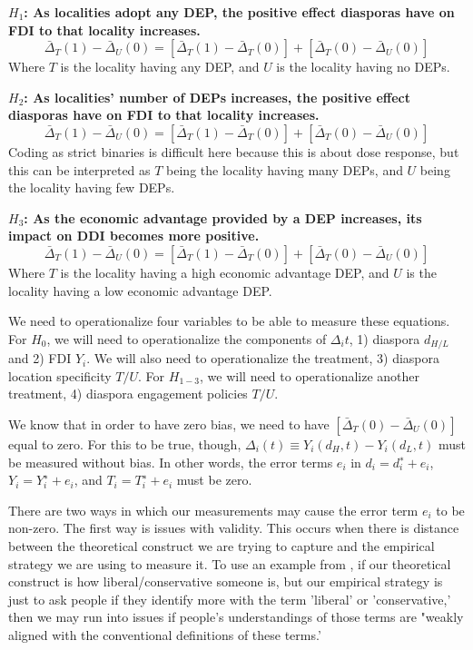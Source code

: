 \documentclass[doublespace,nopageskip]{UVAthesis}
\begin{document}
\textbf{$H_1$:  As localities adopt any DEP, the positive effect diasporas have on FDI to that locality increases.}
\[
\bar{\Delta}_T(1)-\bar{\Delta}_U(0)
=
\left[\bar{\Delta}_T(1)-\bar{\Delta}_T(0)\right]
+
\left[\bar{\Delta}_T(0)-\bar{\Delta}_U(0)\right]
\]
Where $T$ is the locality having any DEP, and $U$ is the locality having no DEPs.

\textbf{$H_2$:  As localities' number of DEPs increases, the positive effect diasporas have on FDI to that locality increases.}
\[
\bar{\Delta}_T(1)-\bar{\Delta}_U(0)
=
\left[\bar{\Delta}_T(1)-\bar{\Delta}_T(0)\right]
+
\left[\bar{\Delta}_T(0)-\bar{\Delta}_U(0)\right]
\]
Coding as strict binaries is difficult here because this is about dose response, but this can be interpreted as $T$ being the locality having many DEPs, and $U$ being the locality having few DEPs.

\textbf{$H_3$:  As the economic advantage provided by a DEP increases, its impact on DDI becomes more positive.}
\[
\bar{\Delta}_T(1)-\bar{\Delta}_U(0)
=
\left[\bar{\Delta}_T(1)-\bar{\Delta}_T(0)\right]
+
\left[\bar{\Delta}_T(0)-\bar{\Delta}_U(0)\right]
\]
Where $T$ is the locality having a high economic advantage DEP, and $U$ is the locality having a low economic advantage DEP.

    We need to operationalize four variables to be able to measure these equations. For $H_0$, we will need to operationalize the components of $\Delta_it$, 1) diaspora $d_{H/L}$ and 2) FDI $Y_i$. We will also need to operationalize the treatment, 3) diaspora location specificity $T/U$. For $H_{1-3}$, we will need to operationalize another treatment, 4) diaspora engagement policies $T/U$.  

     We know that in order to have zero bias, we need to have $\left[\bar{\Delta}_T(0)-\bar{\Delta}_U(0)\right]$ equal to zero. For this to be true, though, $
\Delta_i(t) \equiv Y_i(d_H,t)-Y_i(d_L,t)$ must be measured without bias. In other words, the error terms $e_i$ in $d_i​=d_i^∗​+e_i$, $Y_i​=Y_i^∗​+e_i$, and $T_i​=T_i^∗​+e_i$ must be zero. 

    There are two ways in which our measurements may cause the error term $e_i$ to be non-zero. The first way is issues with validity. This occurs when there is distance between the theoretical construct we are trying to capture and the empirical strategy we are using to measure it. To use an example from \citet{yeung_self-reported_2025}, if our theoretical construct is how liberal/conservative someone is, but our empirical strategy is just to ask people if they identify more with the term 'liberal' or 'conservative,' then we may run into issues if people's understandings of those terms are "weakly aligned with the conventional definitions of these terms.'
    
\end{document}
